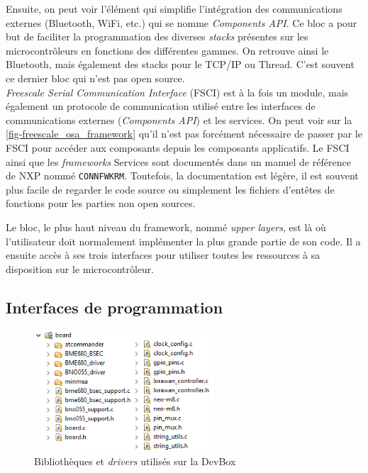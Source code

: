 Ensuite, on peut voir l'élément qui simplifie l'intégration des communications externes (Bluetooth, WiFi, etc.) qui se nomme \textit{Components API}. Ce bloc a pour but de faciliter la programmation des diverses \textit{stacks} présentes sur les microcontrôleurs en fonctions des différentes gammes. On retrouve ainsi le Bluetooth, mais également des stacks pour le TCP/IP ou Thread. C'est souvent ce dernier bloc qui n'est pas open source. \\

\textit{Freescale Serial Communication Interface} (FSCI) est à la fois un module, mais également un protocole de communication utilisé entre les interfaces de communications externes (\textit{Components API}) et les services. On peut voir sur la \cref{fig-freescale_osa_framework} qu'il n'est pas forcément nécessaire de passer par le FSCI pour accéder aux composants depuis les composants applicatifs. Le FSCI ainsi que les \textit{frameworks} Services sont documentés dans un manuel de référence de NXP nommé \texttt{CONNFWKRM}. Toutefois, la documentation est légère, il est souvent plus facile de regarder le code source ou simplement les fichiers d'entêtes de fonctions pour les parties non open sources.

Le bloc, le plus haut niveau du framework, nommé \textit{upper layers}, est là où l'utilisateur doit normalement implémenter la plus grande partie de son code. Il a ensuite accès à ses trois interfaces pour utiliser toutes les ressources à sa disposition sur le microcontrôleur.


\FloatBarrier
\subsection{Interfaces de programmation}


\begin{figure}[ht!]
    \centering
    \includegraphics[width=0.6\textwidth]{Figures/Software/kw41z/board_paths.png}
    \caption{Bibliothèques et \textit{drivers} utilisés sur la DevBox}
    \label{fig-board_paths}
\end{figure}

